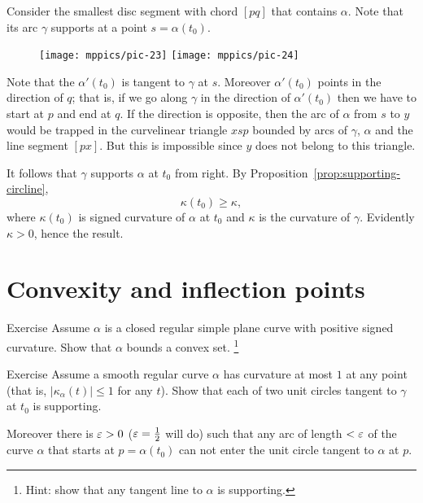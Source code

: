 Consider the smallest disc segment with chord $[pq]$ that contains $\alpha$.
Note that its arc $\gamma$ supports at a point $s=\alpha(t_0)$.

\begin{wrapfigure}{R}{50 mm}
\centering
\texttt{[image: mppics/pic-23]}
\bigskip
\texttt{[image: mppics/pic-24]}
\vskip0mm
\end{wrapfigure}

Note that the $\alpha'(t_0)$ is tangent to $\gamma$ at $s$.
Moreover $\alpha'(t_0)$ points in the direction of $q$;
that is, if we go along $\gamma$ in the direction  of $\alpha'(t_0)$ then we have to start at $p$ and end at $q$.
If the direction is opposite, then the arc of $\alpha$ from $s$ to $y$ would be trapped in the curvelinear triangle $xsp$ bounded by arcs of $\gamma$, $\alpha$ and the line segment $[px]$.
But this is impossible since $y$ does not belong to this triangle.



It follows that $\gamma$ supports $\alpha$ at $t_0$ from right.
By Proposition~\ref{prop:supporting-circline}, 
\[\kappa(t_0)\ge \kappa,\]
where $\kappa(t_0)$ is signed curvature of $\alpha$ at $t_0$ and $\kappa$ is the curvature of $\gamma$.
Evidently $\kappa>0$, hence the result.
\qeds

\section{Convexity and inflection points}

\begin{thm}{Exercise}
Assume $\alpha$ is a closed regular simple plane curve with positive signed curvature.
Show that $\alpha$ bounds a convex set.%
\footnote{Hint: show that any tangent line to $\alpha$ is supporting.}
\end{thm}

\begin{thm}{Exercise}\label{ex:1-supporting} Assume a smooth regular curve $\alpha$ has curvature at most $1$ at any point (that is, $|\kappa_\alpha(t)|\le 1$ for any $t$).
Show that each of two unit circles tangent to $\gamma$ at $t_0$ is supporting.

Moreover there is $\varepsilon>0$ ($\varepsilon=\tfrac12$ will do) such that any arc of length $<\varepsilon$ of the curve $\alpha$ that starts at $p=\alpha(t_0)$ can not enter the unit circle tangent to $\alpha$ at $p$.  
\end{thm}


